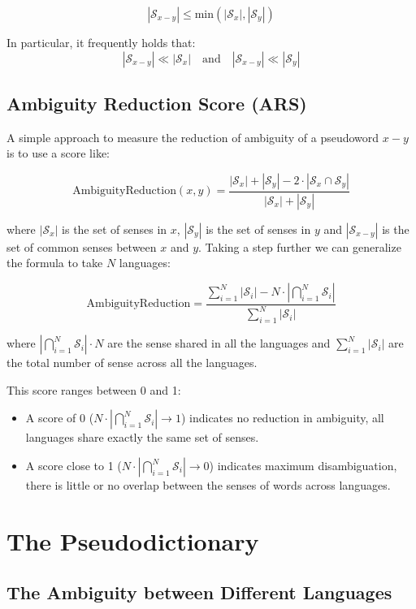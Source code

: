 \documentclass[runningheads]{llncs}
\begin{document}
\[
  |\mathcal{S}_{x-y}| \leq \text{min}(|\mathcal{S}_x|, |\mathcal{S}_y|)
\]

In particular, it frequently holds that:
\[
|\mathcal{S}_{x-y}| \ll |\mathcal{S}_x| \quad \text{and} \quad |\mathcal{S}_{x-y}| \ll |\mathcal{S}_y|
\]

\subsection{Ambiguity Reduction Score (ARS)}

A simple approach to measure the reduction of ambiguity of a pseudoword $x-y$ is to use a score like: 

\[
  \text{AmbiguityReduction}(x, y) = \frac{|\mathcal{S}_x| + |\mathcal{S}_y| - 2 \cdot |\mathcal{S}_x \cap \mathcal{S}_y|}{|\mathcal{S}_x| + |\mathcal{S}_y|}
\]

where $|\mathcal{S}_x|$ is the set of senses in $x$, $|\mathcal{S}_y|$ is the set of senses in $y$ and $|\mathcal{S}_{x-y}|$ is the set of common senses between $x$ and $y$. Taking a step further we can generalize the formula to take $N$ languages: 

\[
  \text{AmbiguityReduction} = \frac{\sum_{i=1}^N |\mathcal{S}_i| - N \cdot \left|\bigcap_{i=1}^N \mathcal{S}_i\right|}{\sum_{i=1}^N |\mathcal{S}_i|}
\]

where $|\bigcap_{i=1}^N \mathcal{S}_i| \cdot N$ are the sense shared in all the languages and $\sum_{i=1}^N |\mathcal{S}_i|$ are the total number of sense across all the languages.

This score ranges between 0 and 1:
\begin{itemize}
  \item A score of 0 ($N \cdot \left|\bigcap_{i=1}^N \mathcal{S}_i\right| \rightarrow 1$) indicates no reduction in ambiguity, all languages share exactly the same set of senses.
  \item A score close to 1 ($N \cdot \left|\bigcap_{i=1}^N \mathcal{S}_i\right| \rightarrow 0$) indicates maximum disambiguation, there is little or no overlap between the senses of words across languages.
\end{itemize}

\section{The Pseudodictionary}

\subsection{The Ambiguity between Different Languages}
\end{document}
